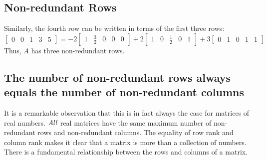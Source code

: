 \documentclass[12pt]{article}
\begin{document}
\begin{tcolorbox}[colback=gray!5!white, colframe=black!75!black, title=Figure 1. Example of the Equality of Row Rank and Column Rank, left=5pt, right=5pt, top=10pt, bottom=10pt, enlarge right by=-.5mm]
\subsection*{Non-redundant Rows}
Similarly, the fourth row can be written in terms of the first three rows:
\[
\begin{bmatrix}
    0 & 0 & 1 & 3 & 5
\end{bmatrix}
= -2 \begin{bmatrix}
    1 & \frac{3}{2} & 0 &0 &0
\end{bmatrix}
+ 2 \begin{bmatrix}
    1 & 0 & \frac{1}{2} & 0 &1
\end{bmatrix}
+ 3 \begin{bmatrix}
    0 & 1 & 0 & 1 &1
\end{bmatrix}
\]
Thus, $A$ has three non-redundant rows. 
\subsection*{The number of non-redundant rows always equals the number of non-redundant columns}
It is a remarkable observation that this is in fact always the case for matrices of real numbers. $\it{All}$ real matrices have the same maximum number of non-redundant rows and non-redundant columns. The equality of row rank and column rank makes it clear that a matrix is more than a collection of numbers. There is a fundamental relationship between the rows and columns of a matrix. 
\end{tcolorbox}
\end{document}
